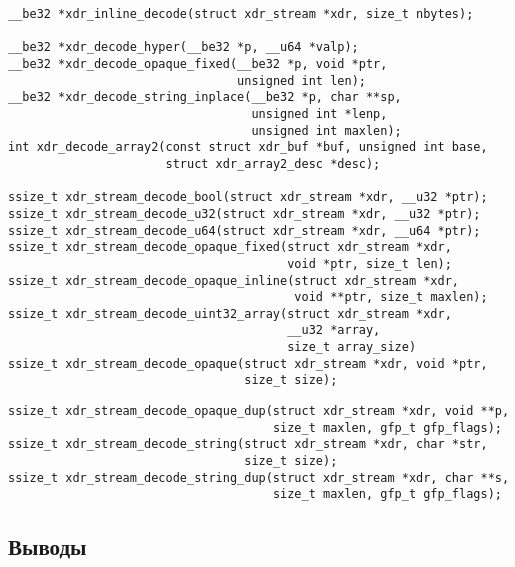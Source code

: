 \begin{lstlisting}[caption={Функции для декодирования (часть 1)}, label={lst:xdr_decode1}]
__be32 *xdr_inline_decode(struct xdr_stream *xdr, size_t nbytes);

__be32 *xdr_decode_hyper(__be32 *p, __u64 *valp);
__be32 *xdr_decode_opaque_fixed(__be32 *p, void *ptr,
                                unsigned int len);
__be32 *xdr_decode_string_inplace(__be32 *p, char **sp,
                                  unsigned int *lenp,
                                  unsigned int maxlen);
int xdr_decode_array2(const struct xdr_buf *buf, unsigned int base,
                      struct xdr_array2_desc *desc);

ssize_t xdr_stream_decode_bool(struct xdr_stream *xdr, __u32 *ptr);
ssize_t xdr_stream_decode_u32(struct xdr_stream *xdr, __u32 *ptr);
ssize_t xdr_stream_decode_u64(struct xdr_stream *xdr, __u64 *ptr);
ssize_t xdr_stream_decode_opaque_fixed(struct xdr_stream *xdr,
                                       void *ptr, size_t len);
ssize_t xdr_stream_decode_opaque_inline(struct xdr_stream *xdr,
                                        void **ptr, size_t maxlen);
ssize_t xdr_stream_decode_uint32_array(struct xdr_stream *xdr,
                                       __u32 *array,
                                       size_t array_size)
ssize_t xdr_stream_decode_opaque(struct xdr_stream *xdr, void *ptr,
                                 size_t size);
\end{lstlisting}
\begin{lstlisting}[caption={Функции для декодирования (часть 2)}, label={lst:xdr_decode2}]
ssize_t xdr_stream_decode_opaque_dup(struct xdr_stream *xdr, void **p,
                                     size_t maxlen, gfp_t gfp_flags);
ssize_t xdr_stream_decode_string(struct xdr_stream *xdr, char *str,
                                 size_t size);
ssize_t xdr_stream_decode_string_dup(struct xdr_stream *xdr, char **s,
                                     size_t maxlen, gfp_t gfp_flags);
\end{lstlisting}

\subsection*{Выводы}

